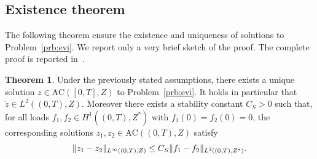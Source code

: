 \documentclass[a4paper,10pt,oneside]{amsbook}
\numberwithin{section}{chapter}
\numberwithin{equation}{chapter}
\theoremstyle{definition}
\newtheorem{thm}[prop]{Theorem}
\DeclarePairedDelimiter{\norm}{\lVert}{\rVert}
\DeclarePairedDelimiter{\dual}{\langle}{\rangle}
\begin{document}
\subsection{Existence theorem}
The following theorem ensure the existence and uniqueness of solutions to Problem~\ref{prb:evi}. We report only a very brief sketch of the proof. The complete proof is reported in~\cite[Theorem 7.3, Theorem 7.4]{han-reddy}.
\begin{thm}
\label{thm:han-reddy}
Under the previously stated assumptions, there exists a unique solution $z\in\text{AC}([0,T],Z)$ to Problem~\ref{prb:evi}. It holds in particular that $\dot z\in L^2((0,T),Z)$. Moreover there exists a stability constant $C_S>0$ such that, for all loads $f_1,f_2\in H^1((0,T),Z^*)$ with $f_1(0)=f_2(0)=0$, the corresponding solutions $z_1,z_2\in\text{AC}((0,T),Z)$ satisfy
\[
\norm{z_1-z_2}_{L^\infty((0,T),Z)}\le C_S\norm{f_1-f_2}_{L^2((0,T),Z^*)}.
\]
\end{thm}
\end{document}
